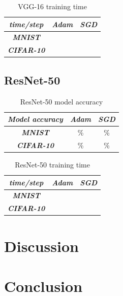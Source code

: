 \documentclass[conference]{IEEEtran}
\begin{document}
\begin{table}[htbp]
    \caption{VGG-16 training time}
    \begin{center}
    \begin{tabular}{|c|c|c|}
    \cline{1-3} 
    \textit{time/step} & \textbf{\textit{Adam}}& \textbf{\textit{SGD}} \\
    \hline
    \textbf{\textit{MNIST}} &  &  \\
    \hline
    \textbf{\textit{CIFAR-10}} &  &  \\
    \cline{1-3} 
    \end{tabular}
    \label{tab: VGG-16 training time}
    \end{center}
\end{table}

\subsection{ResNet-50}

\begin{table}[htbp]
    \caption{ResNet-50 model accuracy}
    \begin{center}
    \begin{tabular}{|c|c|c|}
    \cline{1-3} 
    \textit{Model accuracy} & \textbf{\textit{Adam}}& \textbf{\textit{SGD}} \\
    \hline
    \textbf{\textit{MNIST}} & \% & \% \\
    \hline
    \textbf{\textit{CIFAR-10}} & \% & \% \\
    \cline{1-3} 
    \end{tabular}
    \label{tab: ResNet-50 model accuracy}
    \end{center}
\end{table}

\begin{table}[htbp]
    \caption{ResNet-50 training time}
    \begin{center}
    \begin{tabular}{|c|c|c|}
    \cline{1-3} 
    \textit{time/step} & \textbf{\textit{Adam}}& \textbf{\textit{SGD}} \\
    \hline
    \textbf{\textit{MNIST}} &  &  \\
    \hline
    \textbf{\textit{CIFAR-10}} &  &  \\
    \cline{1-3} 
    \end{tabular}
    \label{tab: ResNet-50 training time}
    \end{center}
\end{table}

\section{Discussion}

\section{Conclusion}

\printbibliography
\end{document}
